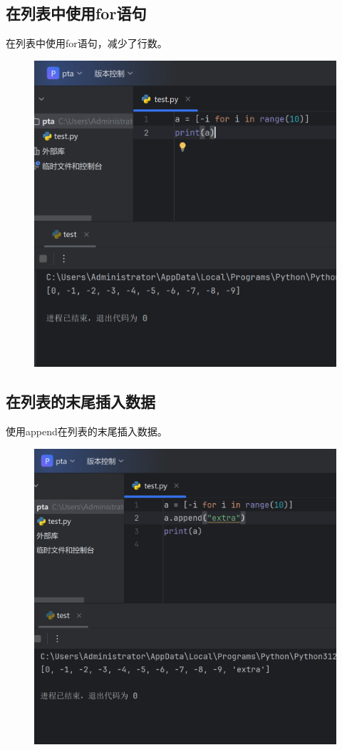 \documentclass{article}
\begin{document}
\subsection{在列表中使用for语句}
在列表中使用for语句，减少了行数。
\begin{figure}[H]
    \centering
    \includegraphics[width=1\linewidth]{for_list.png}
\end{figure}


\newpage
\subsection{在列表的末尾插入数据}
使用append在列表的末尾插入数据。
\begin{figure}[H]
    \centering
    \includegraphics[width=1\linewidth]{apend.png}
\end{figure}
\newpage
\end{document}
